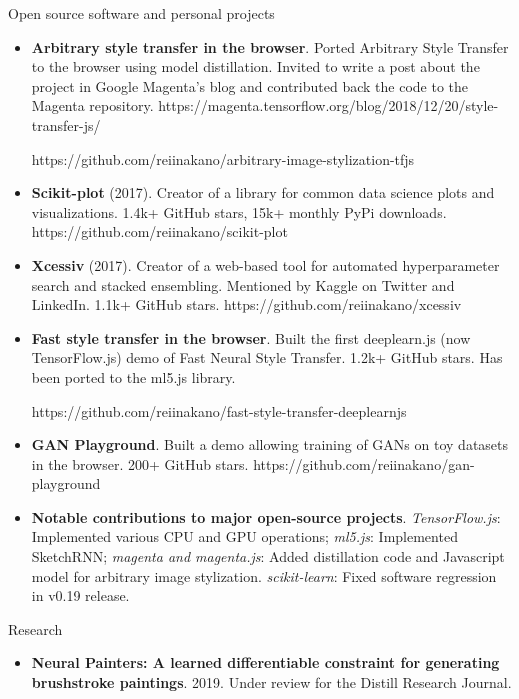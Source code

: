 \documentclass[]{mcdowellcv}
\begin{document}
	\begin{cvsection}{Open source software and personal projects}
		\begin{cvsubsection}{}{}{}
			\begin{itemize}
			    \item \textbf{Arbitrary style transfer in the browser}. Ported Arbitrary Style Transfer to the browser using model distillation. Invited to write a post about the project in Google Magenta's blog and contributed back the code to the Magenta repository. https://magenta.tensorflow.org/blog/2018/12/20/style-transfer-js/
			    
			    https://github.com/reiinakano/arbitrary-image-stylization-tfjs 
			    \item \textbf{Scikit-plot} (2017). Creator of a library for common data science plots and visualizations. 1.4k+ GitHub stars, 15k+ monthly PyPi downloads. https://github.com/reiinakano/scikit-plot
				\item \textbf{Xcessiv} (2017). Creator of a web-based tool for automated hyperparameter search and stacked ensembling. Mentioned by Kaggle on Twitter and LinkedIn. 1.1k+ GitHub stars. https://github.com/reiinakano/xcessiv
				\item \textbf{Fast style transfer in the browser}. Built the first deeplearn.js (now TensorFlow.js) demo of Fast Neural Style Transfer. 1.2k+ GitHub stars. Has been ported to the ml5.js library. 
				
				https://github.com/reiinakano/fast-style-transfer-deeplearnjs
				\item \textbf{GAN Playground}. Built a demo allowing training of GANs on toy datasets in the browser. 200+ GitHub stars. https://github.com/reiinakano/gan-playground
				\item \textbf{Notable contributions to major open-source projects}. \textit{TensorFlow.js}: Implemented various CPU and GPU operations; \textit{ml5.js}: Implemented SketchRNN; \textit{magenta and magenta.js}: Added distillation code and Javascript model for arbitrary image stylization. \textit{scikit-learn}: Fixed software regression in v0.19 release.
			\end{itemize}
		\end{cvsubsection}
	\end{cvsection}
	
	\begin{cvsection}{Research}
	   \begin{cvsubsection}{}{}{}
	      \begin{itemize}
	          \item \textbf{Neural Painters: A learned differentiable constraint for generating brushstroke paintings}. 2019. Under review for the Distill Research Journal.
	      \end{itemize}
	   \end{cvsubsection}
	\end{cvsection}
	
\end{document}
